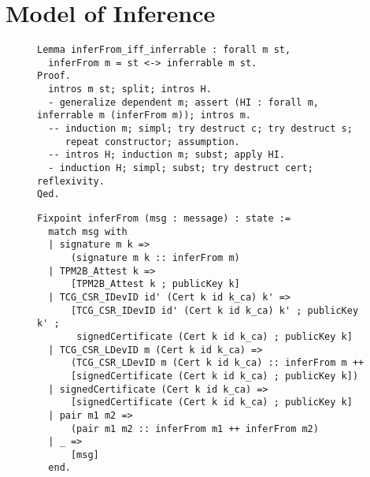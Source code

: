 \chapter{Model of Inference}
\begin{figure}[h]
\begin{lstlisting}[language=Coq]
Lemma inferFrom_iff_inferrable : forall m st,
  inferFrom m = st <-> inferrable m st.
Proof.
  intros m st; split; intros H.
  - generalize dependent m; assert (HI : forall m, inferrable m (inferFrom m)); intros m.
  -- induction m; simpl; try destruct c; try destruct s; 
     repeat constructor; assumption.
  -- intros H; induction m; subst; apply HI.
  - induction H; simpl; subst; try destruct cert; reflexivity.
Qed.
\end{lstlisting}
\end{figure}



\begin{figure}[h]
\begin{lstlisting}[language=Coq]
Fixpoint inferFrom (msg : message) : state :=
  match msg with
  | signature m k => 
      (signature m k :: inferFrom m)
  | TPM2B_Attest k => 
      [TPM2B_Attest k ; publicKey k]
  | TCG_CSR_IDevID id' (Cert k id k_ca) k' => 
      [TCG_CSR_IDevID id' (Cert k id k_ca) k' ; publicKey k' ; 
       signedCertificate (Cert k id k_ca) ; publicKey k]
  | TCG_CSR_LDevID m (Cert k id k_ca) => 
      (TCG_CSR_LDevID m (Cert k id k_ca) :: inferFrom m ++ 
      [signedCertificate (Cert k id k_ca) ; publicKey k])
  | signedCertificate (Cert k id k_ca) => 
      [signedCertificate (Cert k id k_ca) ; publicKey k]
  | pair m1 m2 => 
      (pair m1 m2 :: inferFrom m1 ++ inferFrom m2)
  | _ => 
      [msg]
  end.

  \end{lstlisting}
  \end{figure}



